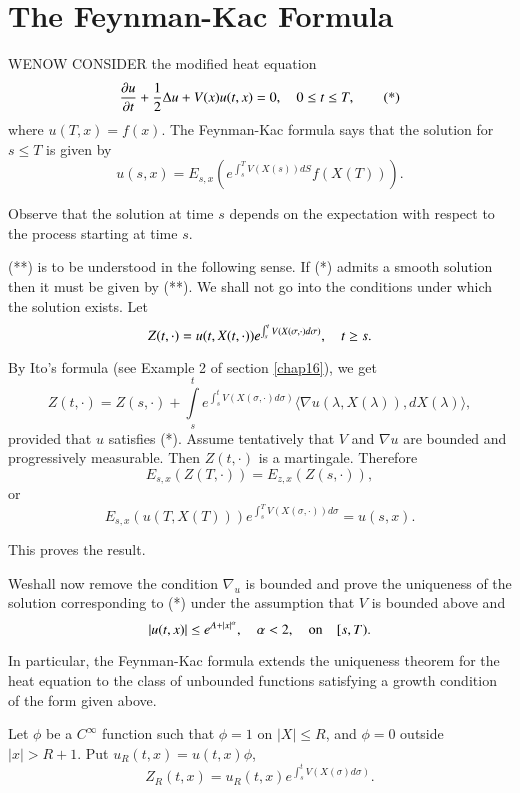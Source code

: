 \chapter{The Feynman-Kac Formula}\label{chap18}

WE\pageoriginale NOW CONSIDER the modified heat equation
\begin{equation*}
\frac{\partial u}{\partial t}+\frac{1}{2}\Delta u+V(x)u(t,x)=0,\quad 0\leq t\leq T,\tag{*}
\end{equation*}
where $u(T,x)=f(x)$. The Feynman-Kac formula says that the solution
for $s\leq T$ is given by
\begin{equation*}
u(s,x)=E_{s,x}(e^{\int^{T}_{s}V(X(s))dS}f(X(T))).\tag{**}
\end{equation*}

Observe that the solution at time $s$ depends on the expectation with
respect to the process starting at time $s$.

\begin{note*}
(**) is to be understood in the following sense. If (*) admits a
  smooth solution then it must be given by (**). We shall not go into
  the conditions under which the solution exists. Let
$$
Z(t,\cdot)=u(t,X(t,\cdot))e^{\int^{t}_{s}V(X(\sigma,\cdot)d\sigma)},\quad
t\geq s.
$$

By Ito's formula (see Example 2 of section
\ref{chap16}), we get 
$$
Z(t,\cdot)=Z(s,\cdot)+\int\limits^{t}_{s}e^{\int^{t}_{s}V(X(\sigma,\cdot)d\sigma)}
\langle \nabla u(\lambda,X(\lambda)),dX(\lambda)\rangle,
$$
provided that $u$ satisfies (*). Assume tentatively that $V$ and
$\nabla u$ are bounded and progressively measurable. Then $Z(t,\cdot)$
is a martingale. Therefore
$$
E_{s,x}(Z(T,\cdot))=E_{z,x}(Z(s,\cdot)),
$$
or
$$
E_{s,x}(u(T,X(T)))e^{\int^{T}_{s}V(X(\sigma,\cdot))d\sigma}=u(s,x).
$$

This proves the result.
\end{note*}


We\pageoriginale shall now remove the condition $\nabla_{u}$ is
bounded and prove the uniqueness of the solution corresponding to (*)
under the assumption that $V$ is bounded above and
$$
|u(t,x)|\leq e^{A+|x|^{\alpha}},\quad \alpha<2,\quad \text{on}\quad [s,T).
$$

In particular, the Feynman-Kac formula extends the uniqueness theorem
for the heat equation to the class of unbounded functions satisfying a
growth condition of the form given above.

Let $\phi$ be a $C^{\infty}$ function such that $\phi=1$ on $|X|\leq
R$, and $\phi=0$ outside $|x|>R+1$. Put $u_{R}(t,x)=u(t,x)\phi$,
$$
Z_{R}(t,x)=u_{R}(t,x)e^{\int^{t}_{s}V(X(\sigma)d\sigma)}.
$$


